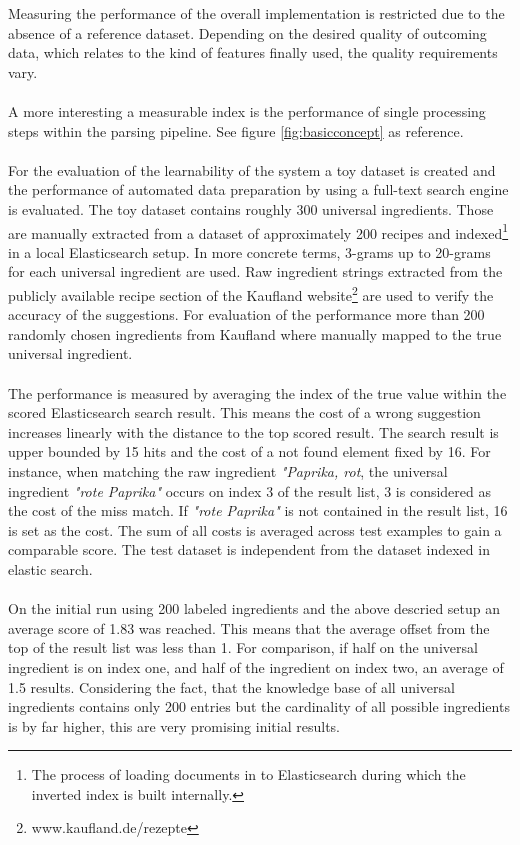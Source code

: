 Measuring the performance of the overall implementation is restricted due to the absence of a reference dataset. Depending on the desired quality of outcoming data, which relates to the kind of features finally used, the quality requirements vary. 
\\\\
A more interesting a measurable index is the performance of single processing steps within the parsing pipeline. See figure \ref{fig:basicconcept} as reference. 
\\\\
For the evaluation of the learnability of the system a toy dataset is created and the performance of automated data preparation by using a full-text search engine is evaluated. The toy dataset contains roughly 300 universal ingredients. Those are manually extracted from a dataset of approximately 200 recipes and indexed\footnote{The process of loading documents in to Elasticsearch during which the inverted index is built internally.} in a local Elasticsearch setup. In more concrete terms, 3-grams up to 20-grams for each universal ingredient are used. Raw ingredient strings extracted from the publicly available recipe section of the Kaufland website\footnote{www.kaufland.de/rezepte} are used to verify the accuracy of the suggestions. For evaluation of the performance more than 200 randomly chosen ingredients from Kaufland where manually mapped to the true universal ingredient. 
\\\\
The performance is measured by averaging the index of the true value within the scored Elasticsearch search result. This means the cost of a wrong suggestion increases linearly with the distance to the top scored result. The search result is upper bounded by 15 hits and the cost of a not found element fixed by 16. For instance, when matching the raw ingredient \textit{"Paprika, rot}, the universal ingredient \textit{"rote Paprika"} occurs on index 3 of the result list, 3 is considered as the cost of the miss match. If \textit{"rote Paprika"} is not contained in the result list, 16 is set as the cost. The sum of all costs is averaged across test examples to gain a comparable score. The test dataset is independent from the dataset indexed in elastic search.
\\\\
On the initial run using 200 labeled ingredients and the above descried setup an average score of 1.83 was reached. This means that the average offset from the top of the result list was less than 1. For comparison, if half on the universal ingredient is on index one, and half of the ingredient on index two, an average of 1.5 results. Considering the fact, that the knowledge base of all universal ingredients contains only 200 entries but the cardinality of all possible ingredients is by far higher, this are very promising initial results. 

